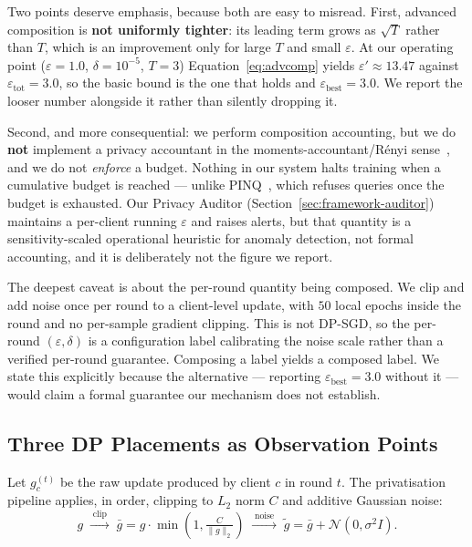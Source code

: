 Two points deserve emphasis, because both are easy to misread. First,
advanced composition is \textbf{not uniformly tighter}: its leading term
grows as $\sqrt{T}$ rather than $T$, which is an improvement only for
large $T$ and small $\varepsilon$. At our operating point
($\varepsilon = 1.0$, $\delta = 10^{-5}$, $T = 3$)
Equation~\ref{eq:advcomp} yields $\varepsilon' \approx 13.47$ against
$\varepsilon_{\text{tot}} = 3.0$, so the basic bound is the one that
holds and $\varepsilon_{\text{best}} = 3.0$. We report the looser number
alongside it rather than silently dropping it.

Second, and more consequential: we perform composition accounting, but we
do \textbf{not} implement a privacy accountant in the
moments-accountant/R\'enyi sense~\cite{abadi2016deep}, and we do not
\emph{enforce} a budget. Nothing in our system halts training when a
cumulative budget is reached --- unlike PINQ~\cite{mcsherry2009pinq},
which refuses queries once the budget is exhausted. Our Privacy Auditor
(Section~\ref{sec:framework-auditor}) maintains a per-client running
$\varepsilon$ and raises alerts, but that quantity is a sensitivity-scaled
operational heuristic for anomaly detection, not formal accounting, and it
is deliberately not the figure we report.

The deepest caveat is about the per-round quantity being composed. We clip
and add noise once per round to a client-level update, with $50$ local
epochs inside the round and no per-sample gradient clipping. This is not
DP-SGD, so the per-round $(\varepsilon,\delta)$ is a configuration label
calibrating the noise scale rather than a verified per-round guarantee.
Composing a label yields a composed label. We state this explicitly
because the alternative --- reporting $\varepsilon_{\text{best}} = 3.0$
without it --- would claim a formal guarantee our mechanism does not
establish.

\subsection{Three DP Placements as Observation Points}
\label{sec:prelim-placements}

Let $g_c^{(t)}$ be the raw update produced by client $c$ in round $t$.
The privatisation pipeline applies, in order, clipping to $L_2$ norm $C$
and additive Gaussian noise:
\begin{equation}
g \;\xrightarrow{\;\text{clip}\;}\; \bar{g} = g \cdot \min\!\left(1, \tfrac{C}{\lVert g \rVert_2}\right)
\;\xrightarrow{\;\text{noise}\;}\; \tilde{g} = \bar{g} + \mathcal{N}(0, \sigma^2 I).
\label{eq:pipeline}
\end{equation}

